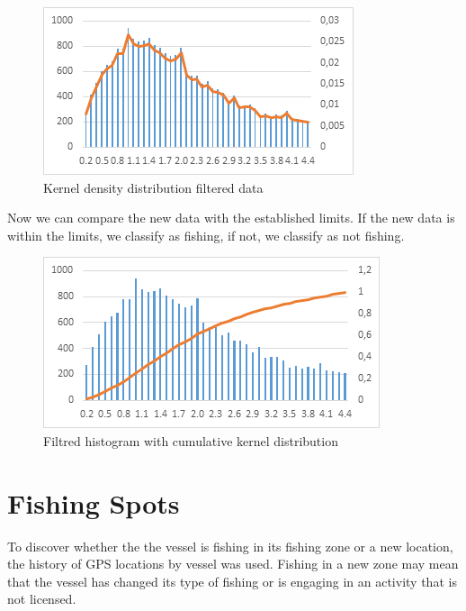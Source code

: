 \begin{figure}[H]
    \centering
    \includegraphics[width=0.8\linewidth]{Chapters/img/hist_kernel.png}
    \caption{Kernel density distribution filtered data}
    \label{fig:hist_kernel}
\end{figure}


Now we can compare the new data with the established limits. If the new data is within the limits, we classify as fishing, if not, we classify as not fishing.

\begin{figure}[H]
    \centering
    \includegraphics[width=0.8\linewidth]{Chapters/img/hist_comulative.png}
    \caption{Filtred histogram with cumulative kernel distribution}
    \label{fig:hist_comulative}
\end{figure}




\section{Fishing Spots} %
\label{sub:fishing_spots}

To discover whether the
the vessel is fishing in its fishing zone or a new location, the history of GPS locations by vessel was used.
Fishing in a new zone may mean that the vessel has changed its type of fishing or is engaging in an activity that is not licensed.


